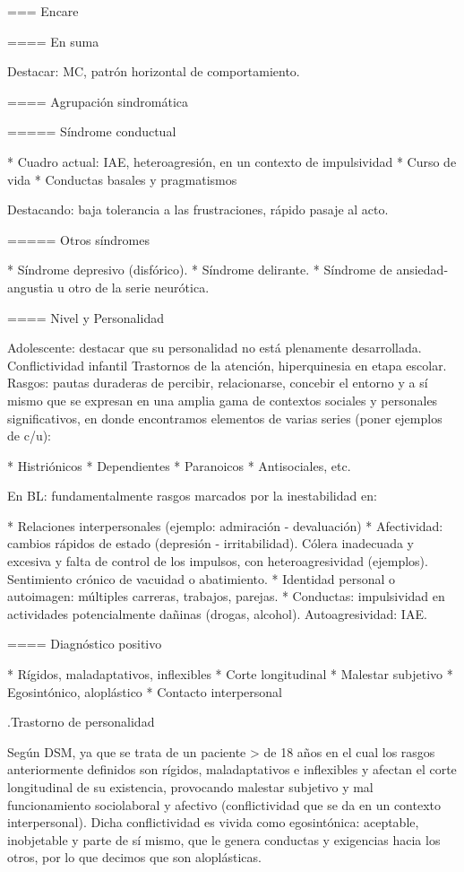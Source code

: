 === Encare

==== En suma

Destacar: MC, patrón horizontal de comportamiento.

==== Agrupación sindromática

===== Síndrome conductual

* Cuadro actual: IAE, heteroagresión, en un contexto de impulsividad
* Curso de vida
* Conductas basales y pragmatismos

Destacando: baja tolerancia a las frustraciones, rápido pasaje al acto.

===== Otros síndromes

* Síndrome depresivo (disfórico).
* Síndrome delirante.
* Síndrome de ansiedad-angustia u otro de la serie neurótica.

==== Nivel y Personalidad

Adolescente: destacar que su personalidad no está plenamente desarrollada. Conflictividad infantil Trastornos de la atención, hiperquinesia en etapa escolar. Rasgos: pautas duraderas de percibir, relacionarse, concebir el entorno y a sí mismo que se expresan en una amplia gama de contextos sociales y personales significativos, en donde encontramos elementos de varias series (poner ejemplos de c/u):

* Histriónicos
* Dependientes
* Paranoicos
* Antisociales, etc.

En BL: fundamentalmente rasgos marcados por la inestabilidad en:

* Relaciones interpersonales (ejemplo: admiración - devaluación)
* Afectividad: cambios rápidos de estado (depresión - irritabilidad). Cólera inadecuada y excesiva y falta de control de los impulsos, con heteroagresividad (ejemplos). Sentimiento crónico de vacuidad o abatimiento.
* Identidad personal o autoimagen: múltiples carreras, trabajos, parejas.
* Conductas: impulsividad en actividades potencialmente dañinas (drogas, alcohol). Autoagresividad: IAE.

==== Diagnóstico positivo

* Rígidos, maladaptativos, inflexibles
* Corte longitudinal
* Malestar subjetivo
* Egosintónico, aloplástico
* Contacto interpersonal

.Trastorno de personalidad

Según DSM, ya que se trata de un paciente > de 18 años en el cual los rasgos anteriormente definidos son rígidos, maladaptativos e inflexibles y afectan el corte longitudinal de su existencia, provocando malestar subjetivo y mal funcionamiento sociolaboral y afectivo (conflictividad que se da en un contexto interpersonal). Dicha conflictividad es vivida como egosintónica: aceptable, inobjetable y parte de sí mismo, que le genera conductas y exigencias hacia los otros, por lo que decimos que son aloplásticas.

